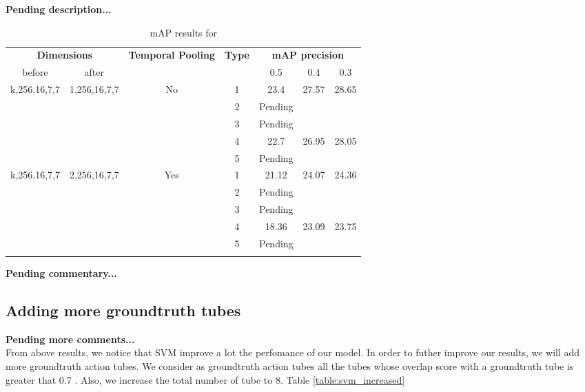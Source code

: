 \textbf{Pending description...}
\begin{center}
\begin{longtable}{||c | c| c| c||c c c||}

  \hline
 \multicolumn{2}{||c|}{\textbf{Dimensions}} & \multirow{2}{4.5em}{\textbf{Temporal Pooling}} &\multirow{2}{*}{ \textbf{Type}} &\multicolumn{3}{|c||}{\textbf{mAP precision}}\\

  before & after & {} & {} &  0.5 &  0.4 & 0.3 \\
  \hline   \hline

  \multirow{5}{*}{k,256,16,7,7} & \multirow{5}{*}{1,256,16,7,7} & \multirow{5}{*}{No}  & 1 & 23.4 & 27.57 &28.65  \\
  \cline{4-7}

  {} & {} & {} & 2 & Pending \\
  \cline{4-7}
  {} & {} & {} & 3 & Pending \\
  \cline{4-7}
  {} & {} & {} & 4 & 22.7 & 26.95 & 28.05 \\
  \cline{4-7}
  {} & {} & {} & 5 & Pending \\
  \hline

  \multirow{5}{*}{k,256,16,7,7} & \multirow{5}{*}{2,256,16,7,7} & \multirow{5}{*}{Yes}  & 1 & 21.12 & 24.07 & 24.36  \\
  \cline{4-7}

  {} & {} & {} & 2 & Pending \\
  \cline{4-7}
  {} & {} & {} & 3 & Pending \\
  \cline{4-7}
  {} & {} & {} & 4 & 18.36 & 23.09 & 23.75 \\
  \cline{4-7}
  
  {} & {} & {} & 5 & Pending \\
  \hline
  \caption{mAP results for   }
  \label{table:svm_temp_pooling_16}
\end{longtable} 
\end{center}

\textbf{Pending commentary...}

\subsection{Adding more groundtruth tubes}
\textbf{Pending more comments...} \\
From above results, we notice that SVM improve a lot the perfomance of our model. In order to futher improve our results, we will
add more groundtruth action tubes. We consider as groundtruth action tubes all the tubes whose overlap score  with a groundtruth tube is
greater that 0.7 . Also, we increase the total number of tube to 8. Table \ref{table:svm_increased}

